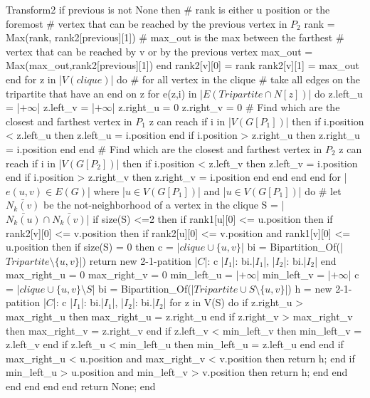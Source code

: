 \begin{code}{Transform2}
    if previous is not None then
      # rank is either u position or the foremost
      # vertex that can be reached by the previous vertex in $P_2$
      rank = Max(rank, rank2[previous][1])
      # max_out is the max between the farthest
      # vertex that can be reached by v or by the previous vertex
      max_out = Max(max_out,rank2[previous][1])
    end
    rank2[v][0] = rank
    rank2[v][1] = max_out
  end
  for z in |$V(clique)$| do # for all vertex in the clique
    # take all edges on the tripartite that have an end on z
    for e(z,i) in |$E(Tripartite \cap N[z])$| do
      z.left_u = |$+\infty$|
      z.left_v = |$+\infty$|
      z.right_u = 0
      z.right_v = 0
      # Find which are the closest and farthest vertex in $P_1$ z can reach
      if i in |$V(G[P_1])$| then
        if i.position < z.left_u then
          z.left_u = i.position
        end
        if i.position > z.right_u then
          z.right_u = i.position
        end
      end
      # Find which are the closest and farthest vertex in $P_2$ z can reach
      if i in |$V(G[P_2])$| then
        if i.position < z.left_v then
          z.left_v = i.position
        end
        if i.position > z.right_v then
          z.right_v = i.position
        end
      end
    end
  end
  for |$e(u,v) \in E(G)$| where |$u \in V(G[P_1])$| and |$u \in V(G[P_1])$| do
    # let $\bar{N_k(v)}$ be the not-neighborhood of a vertex in the clique
    S = |$\bar{N_k(u)} \cap \bar{N_k(v)}$|
    if size(S) <=2 then
     if rank1[u][0] <= u.position then
       if rank2[v][0] <= v.position then
         if rank2[u][0] <= v.position and rank1[v][0] <= u.position then
           if size(S) = 0 then
             c = |$clique \cup \{u,v\}$|
             bi = Bipartition_Of(|$Tripartite \setminus \{u,v\}$|)
             return new 2-1-patition{
               |$C$|: c
               |$I_1$|: bi.|$I_1$|,
               |$I_2$|: bi.|$I_2$|
             }
           end
           max_right_u = 0
           max_right_v = 0
           min_left_u = |$+\infty$|
           min_left_v = |$+\infty$|
           c = |$clique \cup \{u,v\} \setminus S$|
           bi = Bipartition_Of(|$Tripartite \cup S \setminus \{u,v\}$|)
           h = new 2-1-patition{
               |$C$|: c
               |$I_1$|: bi.|$I_1$|,
               |$I_2$|: bi.|$I_2$|
             }
           for z in V(S) do
            if z.right_u > max_right_u then
              max_right_u = z.right_u
            end
            if z.right_v > max_right_v then
              max_right_v = z.right_v
            end
            if z.left_v < min_left_v then
              min_left_v = z.left_v
            end
            if z.left_u < min_left_u then
              min_left_u = z.left_u
            end
           end
           if max_right_u < u.position and max_right_v < v.position then
             return h;
           end
           if min_left_u > u.position and min_left_v > v.position then
             return h;
           end
         end
       end
     end
    end
  end
  return None;
end
\end{code}

